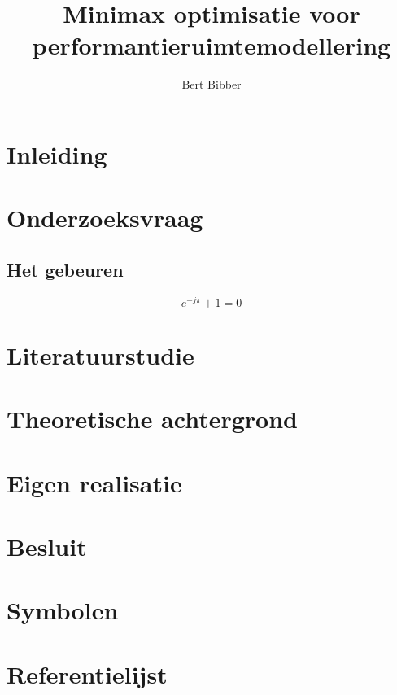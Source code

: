 \documentclass[a4paper,11pt,twoside,openright,english]{uantwerpenbamathesis}
\title{Minimax optimisatie voor performantieruimtemodellering}
\author{Bert Bibber}
\begin{document}
\maketitle

\frontmatter

\tableofcontents

\mainmatter
\chapter*{Inleiding}

\lipsum[1]

\chapter{Onderzoeksvraag}

\section{Het gebeuren}

\lipsum[2]

\begin{equation}
  e^{-j\pi} + 1 = 0
\end{equation}

\lipsum[3]

\chapter{Literatuurstudie}

\chapter{Theoretische achtergrond}

\chapter{Eigen realisatie}

\chapter{Besluit}

\appendix

\chapter{Symbolen}
\chapter{Referentielijst}

\makefinalpage
\end{document}
